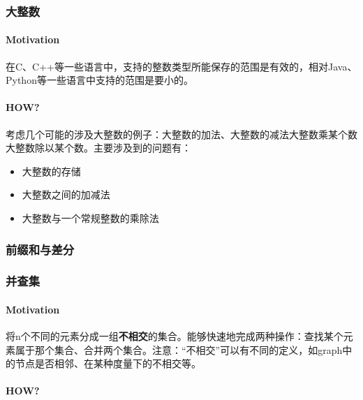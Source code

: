 \subsubsection{大整数}
\paragraph{Motivation}在C、C++等一些语言中，支持的整数类型所能保存的范围是有效的，相对Java、Python等一些语言中支持的范围是要小的。

\paragraph{HOW?}考虑几个可能的涉及大整数的例子：大整数的加法、大整数的减法大整数乘某个数大整数除以某个数。主要涉及到的问题有：
\begin{itemize}
	\item 大整数的存储
	\item 大整数之间的加减法
	\item 大整数与一个常规整数的乘除法
\end{itemize}


\subsubsection{前缀和与差分}


\subsubsection{并查集}
\paragraph{Motivation}将n个不同的元素分成一组\textbf{不相交}的集合。能够快速地完成两种操作：查找某个元素属于那个集合、合并两个集合。注意：“不相交”可以有不同的定义，如graph中的节点是否相邻、在某种度量下的不相交等。

\paragraph{HOW?}